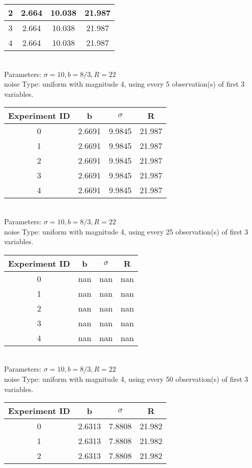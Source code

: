 \begin{multicols}{3}
\begin{tabular}{cccc}
 2 & 2.664 & 10.038 & 21.987\\ \hline 
 3 & 2.664 & 10.038 & 21.987\\ \hline 
 4 & 2.664 & 10.038 & 21.987\\ \hline 
 \end{tabular}\\
Parameters: $\sigma=10, b=8/3, R=22$\\
noise Type: uniform with magnitude 4, using every 5 observation(s) of first 3 variables.\\
\begin{tabular}{cccc}
\hline Experiment ID & b & $\sigma$ & R \\ \hline 
0 & 2.6691 & 9.9845 & 21.987\\ \hline 
 1 & 2.6691 & 9.9845 & 21.987\\ \hline 
 2 & 2.6691 & 9.9845 & 21.987\\ \hline 
 3 & 2.6691 & 9.9845 & 21.987\\ \hline 
 4 & 2.6691 & 9.9845 & 21.987\\ \hline 
 \end{tabular}\\
Parameters: $\sigma=10, b=8/3, R=22$\\
noise Type: uniform with magnitude 4, using every 25 observation(s) of first 3 variables.\\
\begin{tabular}{cccc}
\hline Experiment ID & b & $\sigma$ & R \\ \hline 
0 & nan & nan & nan\\ \hline 
 1 & nan & nan & nan\\ \hline 
 2 & nan & nan & nan\\ \hline 
 3 & nan & nan & nan\\ \hline 
 4 & nan & nan & nan\\ \hline 
 \end{tabular}\\
Parameters: $\sigma=10, b=8/3, R=22$\\
noise Type: uniform with magnitude 4, using every 50 observation(s) of first 3 variables.\\
\begin{tabular}{cccc}
\hline Experiment ID & b & $\sigma$ & R \\ \hline 
0 & 2.6313 & 7.8808 & 21.982\\ \hline 
 1 & 2.6313 & 7.8808 & 21.982\\ \hline 
 2 & 2.6313 & 7.8808 & 21.982\\ \hline 

\end{tabular}
\end{multicols}
